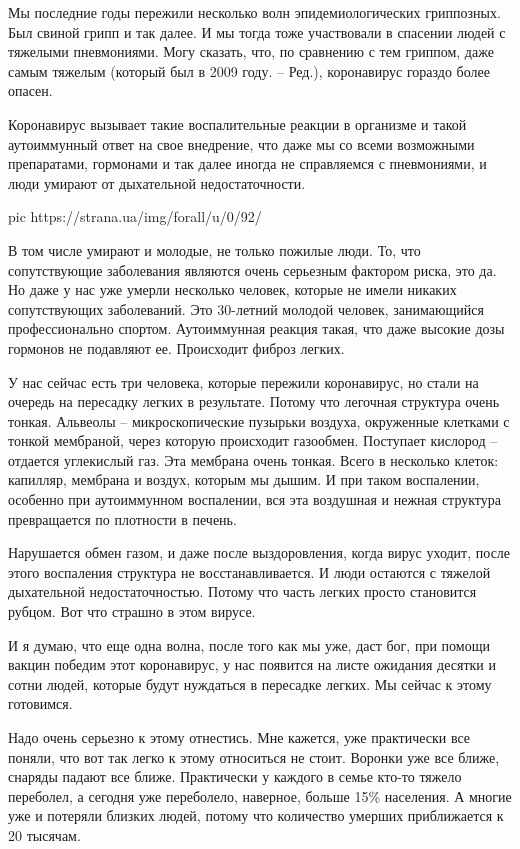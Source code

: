 Мы последние годы пережили несколько волн эпидемиологических гриппозных. Был
свиной грипп и так далее. И мы тогда тоже участвовали в спасении людей с
тяжелыми пневмониями. Могу сказать, что, по сравнению с тем гриппом, даже самым
тяжелым (который был в 2009 году. – Ред.), коронавирус гораздо более опасен. 

Коронавирус вызывает такие воспалительные реакции в организме и такой
аутоиммунный ответ на свое внедрение, что даже мы со всеми возможными
препаратами, гормонами и так далее иногда не справляемся с пневмониями, и люди
умирают от дыхательной недостаточности.

\ifcmt
pic https://strana.ua/img/forall/u/0/92/%
\fi

В том числе умирают и молодые, не только пожилые люди. То, что сопутствующие
заболевания являются очень серьезным фактором риска, это да. Но даже у нас уже
умерли несколько человек, которые не имели никаких сопутствующих заболеваний.
Это 30-летний молодой человек, занимающийся профессионально спортом.
Аутоиммунная реакция такая, что даже высокие дозы гормонов не подавляют ее.
Происходит фиброз легких.

У нас сейчас есть три человека, которые пережили коронавирус, но стали на
очередь на пересадку легких в результате. Потому что легочная структура очень
тонкая. Альвеолы – микроскопические пузырьки воздуха, окруженные клетками с
тонкой мембраной, через которую происходит газообмен. Поступает кислород –
отдается углекислый газ. Эта мембрана очень тонкая. Всего в несколько клеток:
капилляр, мембрана и воздух, которым мы дышим. И при таком воспалении, особенно
при аутоиммунном воспалении, вся эта воздушная и нежная структура превращается
по плотности в печень.

Нарушается обмен газом, и даже после выздоровления, когда вирус уходит, после
этого воспаления структура не восстанавливается. И люди остаются с тяжелой
дыхательной недостаточностью. Потому что часть легких просто становится рубцом.
Вот что страшно в этом вирусе. 

И я думаю, что еще одна волна, после того как мы уже, даст бог, при помощи
вакцин победим этот коронавирус, у нас появится на листе ожидания десятки и
сотни людей, которые будут нуждаться в пересадке легких. Мы сейчас к этому
готовимся.

Надо очень серьезно к этому отнестись. Мне кажется, уже практически все поняли,
что вот так легко к этому относиться не стоит. Воронки уже все ближе, снаряды
падают все ближе. Практически у каждого в семье кто-то тяжело переболел, а
сегодня уже переболело, наверное, больше 15\% населения. А многие уже и
потеряли близких людей, потому что количество умерших приближается к 20
тысячам.

